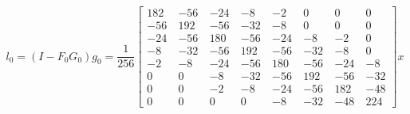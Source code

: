 \begin{equation}
	l_{0} =  (I - F_0 G_0) g_0=
	\frac{1}{256}
	\begin{bmatrix}
		182 ~  & -56  ~ & -24 ~  & -8   ~  & -2  ~  & 0  ~   & 0  ~   & 0   \\
		-56  ~ & 192  ~ & -56 ~  & -32   ~ & -8   ~ & 0  ~   & 0   ~  & 0   \\
		-24  ~ & -56  ~ & 180  ~ & -56 ~   & -24  ~ & -8  ~  & -2   ~ & 0   \\
		-8   ~ & -32  ~ & -56  ~ & 192  ~  & -56  ~ & -32  ~ & -8   ~ & 0   \\
		-2   ~ & -8 ~   & -24  ~ & -56 ~   & 180 ~  & -56  ~ & -24 ~  & -8  \\
		0   ~  & 0  ~   & -8  ~  & -32 ~   & -56  ~ & 192  ~ & -56  ~ & -32 \\
		0   ~  & 0  ~   & -2  ~  & -8  ~   & -24  ~ & -56 ~  & 182  ~ & -48 \\
		0   ~  & 0   ~  & 0  ~   & 0   ~   & -8  ~  & -32 ~  & -48 ~  & 224
	\end{bmatrix}
	x
\end{equation}



